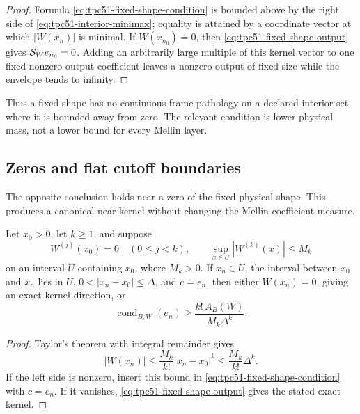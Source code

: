 \begin{proof}
Formula \eqref{eq:tpc51-fixed-shape-condition} is bounded above by the
right side of \eqref{eq:tpc51-interior-minimax}; equality is attained by
a coordinate vector at which \(|W(x_n)|\) is minimal.  If
\(W(x_{n_0})=0\), then \eqref{eq:tpc51-fixed-shape-output} gives
\(\mathcal S_We_{n_0}=0\).  Adding an arbitrarily large multiple of this kernel
vector to one fixed nonzero-output coefficient leaves a nonzero output
of fixed size while the envelope tends to infinity.
\end{proof}

Thus a fixed shape has no continuous-frame pathology on a declared
interior set where it is bounded away from zero.  The relevant condition
is lower physical mass, not a lower bound for every Mellin layer.

\subsection{Zeros and flat cutoff boundaries}

The opposite conclusion holds near a zero of the fixed physical shape.
This produces a canonical near kernel without changing the Mellin
coefficient measure.

\begin{proposition}
\label{prop:tpc51-finite-zero-obstruction}
Let \(x_0>0\), let \(k\ge1\), and suppose
\begin{equation}
 W^{(j)}(x_0)=0\quad(0\le j<k),
 \qquad
 \sup_{x\in U}|W^{(k)}(x)|\le M_k
 \label{eq:tpc51-order-k-zero}
\end{equation}
on an interval \(U\) containing \(x_0\), where \(M_k>0\).  If
\(x_n\in U\), the interval between \(x_0\) and \(x_n\) lies in \(U\),
\(0<|x_n-x_0|\le\Delta\), and \(c=e_n\), then either
\(W(x_n)=0\), giving an exact kernel direction, or
\begin{equation}
 \operatorname{cond}_{B,W}(e_n)
 \ge \frac{k!\,A_B(W)}{M_k\Delta^k}.
 \label{eq:tpc51-order-k-condition}
\end{equation}
\end{proposition}

\begin{proof}
Taylor's theorem with integral remainder gives
\[
 |W(x_n)|\le\frac{M_k}{k!}|x_n-x_0|^k
 \le\frac{M_k}{k!}\Delta^k.
\]
If the left side is nonzero, insert this bound in
\eqref{eq:tpc51-fixed-shape-condition} with \(c=e_n\).  If it vanishes,
\eqref{eq:tpc51-fixed-shape-output} gives the stated exact kernel.
\end{proof}

